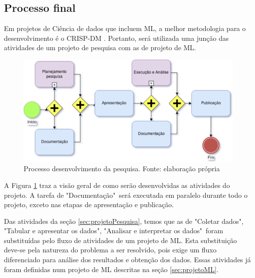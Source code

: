 \subsection{Processo final}

Em projetos de Ciência de dados que incluem ML, a melhor metodologia para o desenvolvimento é o CRISP-DM \cite{crowston_comparing_2017}.
Portanto, será utilizada uma junção das atividades de um projeto de pesquisa com as de projeto de ML.

\begin{figure}[ht]
	\centering
    \includegraphics[keepaspectratio=true,scale=0.5]{figuras/processoPrincipal}
	\caption[Processo desenvolvimento da pesquisa]{Processo desenvolvimento da pesquisa. Fonte: elaboração própria}
	\label{fig:processoPrincipal}
\end{figure}

A Figura \ref{fig:processoPrincipal} traz a visão geral de como serão desenvolvidas as atividades do projeto. A tarefa de "Documentação"\ será executada em paralelo durante todo o projeto, exceto nas etapas de apresentação e publicação.

Das atividades da seção \ref{sec:projetoPesquisa}, temos que as de "Coletar dados", "Tabular e apresentar os dados", "Analisar e interpretar os dados"\ foram substituídas pelo fluxo de atividades de um projeto de ML. Esta substituição deve-se pela natureza do problema a ser resolvido, pois exige um fluxo diferenciado para análise dos resultados e obtenção dos dados. Essas atividades já foram definidas num projeto de ML descritas na seção \ref{sec:projetoML}.

